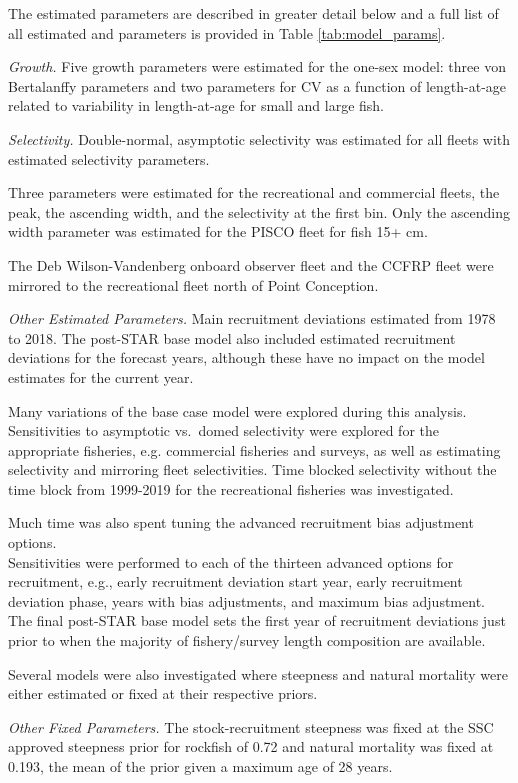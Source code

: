 \documentclass[12pt,]{article}
\begin{document}
The estimated parameters are described in greater detail below and a
full list of all estimated and parameters is provided in Table
\ref{tab:model_params}.

\emph{Growth.} Five growth parameters were estimated for the one-sex
model: three von Bertalanffy parameters and two parameters for CV as a
function of length-at-age related to variability in length-at-age for
small and large fish.

\emph{Selectivity.} Double-normal, asymptotic selectivity was estimated
for all fleets with estimated selectivity parameters.

Three parameters were estimated for the recreational and commercial
fleets, the peak, the ascending width, and the selectivity at the first
bin. Only the ascending width parameter was estimated for the PISCO
fleet for fish 15+ cm.

The Deb Wilson-Vandenberg onboard observer fleet and the CCFRP fleet
were mirrored to the recreational fleet north of Point Conception.

\emph{Other Estimated Parameters.} Main recruitment deviations estimated
from 1978 to 2018. The post-STAR base model also included estimated
recruitment deviations for the forecast years, although these have no
impact on the model estimates for the current year.

Many variations of the base case model were explored during this
analysis. Sensitivities to asymptotic vs.~domed selectivity were
explored for the appropriate fisheries, e.g. commercial fisheries and
surveys, as well as estimating selectivity and mirroring fleet
selectivities. Time blocked selectivity without the time block from
1999-2019 for the recreational fisheries was investigated.

Much time was also spent tuning the advanced recruitment bias adjustment
options.\\
Sensitivities were performed to each of the thirteen advanced options
for recruitment, e.g., early recruitment deviation start year, early
recruitment deviation phase, years with bias adjustments, and maximum
bias adjustment. The final post-STAR base model sets the first year of
recruitment deviations just prior to when the majority of fishery/survey
length composition are available.

Several models were also investigated where steepness and natural
mortality were either estimated or fixed at their respective priors.

\emph{Other Fixed Parameters.} The stock-recruitment steepness was fixed
at the SSC approved steepness prior for rockfish of 0.72 and natural
mortality was fixed at 0.193, the mean of the prior given a maximum age
of 28 years.
\end{document}

